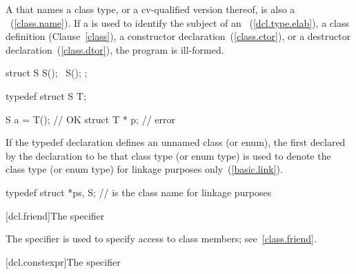 \pnum
\enternote
{}%
A  that names a class type, or a cv-qualified
version thereof, is also a ~(\ref{class.name}). If
a  is used to identify the subject of an
~(\ref{dcl.type.elab}), a class
definition (Clause~\ref{class}), a constructor
declaration~(\ref{class.ctor}), or a destructor
declaration~(\ref{class.dtor}), the program is ill-formed.
\exitnote
\enterexample

\begin{codeblock}
struct S {
  S();
  ~S();
};

typedef struct S T;

S a = T();                      // OK
struct T * p;                   // error
\end{codeblock}
\exitexample

\pnum
{}%
%
%
If the typedef declaration defines an unnamed class (or enum), the first
 declared by the declaration to be that class
type (or enum type) is used to denote the class type (or enum type) for
linkage purposes only~(\ref{basic.link}).
\enterexample

\begin{codeblock}
typedef struct { } *ps, S;      //  is the class name for linkage purposes
\end{codeblock}
\exitexample

[dcl.friend]{The  specifier}%

\pnum
The  specifier is used to specify access to class members;
see~\ref{class.friend}.

[dcl.constexpr]{The  specifier}%

